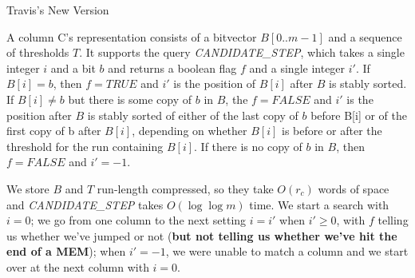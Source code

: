 \documentclass{beamer}
\begin{document}
\begin{frame}{Travis's New Version}
  \begin{block}{}
    A column C's representation consists of a bitvector $B[0..m - 1]$ and a
    sequence of thresholds $T$.  It supports the query \textit{CANDIDATE\_STEP},
    which takes a single 
    integer $i$ and a bit $b$ and returns a boolean flag $f$ and a single
    integer $i'$. 
    If $B[i] = b$, then $f = TRUE$ and $i'$ is the position of $B[i]$ after $B$
    is stably 
    sorted. If $B[i] \neq b$ but there is some copy of $b$ in $B$, the $f =
    FALSE$ and $i'$ 
    is the position after $B$ is stably sorted of either of the last copy of $b$
    before B[i] or of the first copy of b after $B[i]$, depending on whether
    $B[i]$ is 
    before or after the threshold for the run containing $B[i]$.  If there is no
    copy of $b$ in $B$, then $f = FALSE$ and $i' = -1$. 

    We store $B$ and $T$ run-length compressed, so they take $O(r_c)$ words of
    space and \textit{CANDIDATE\_STEP} takes $O(\log \log m)$ time.  We start a
    search with $i = 0$; we go 
    from one column to the next setting $i = i'$ when $i' \geq 0$, with $f$
    telling us whether we've jumped or not (\textbf{but not telling us whether
      we've hit the end of a MEM}); when $i' = -1$, we were unable to match a
    column and we start over at the next column with $i = 0$.  
  \end{block}
\end{frame}
\end{document}
